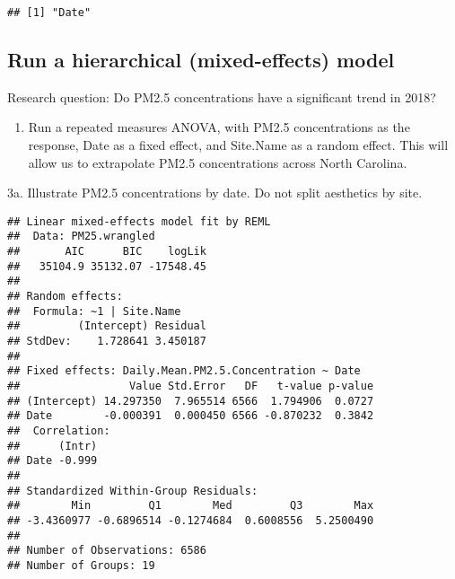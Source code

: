 \documentclass[]{article}
\newenvironment{Shaded}{\begin{snugshade}}{\end{snugshade}}
\newcommand{\KeywordTok}[1]{\textcolor[rgb]{0.13,0.29,0.53}{\textbf{#1}}}
\newcommand{\DataTypeTok}[1]{\textcolor[rgb]{0.13,0.29,0.53}{#1}}
\newcommand{\DecValTok}[1]{\textcolor[rgb]{0.00,0.00,0.81}{#1}}
\newcommand{\FloatTok}[1]{\textcolor[rgb]{0.00,0.00,0.81}{#1}}
\newcommand{\StringTok}[1]{\textcolor[rgb]{0.31,0.60,0.02}{#1}}
\newcommand{\OperatorTok}[1]{\textcolor[rgb]{0.81,0.36,0.00}{\textbf{#1}}}
\newcommand{\NormalTok}[1]{#1}
\providecommand{\tightlist}{%
  \setlength{\itemsep}{0pt}\setlength{\parskip}{0pt}}
\begin{document}
\begin{verbatim}
## [1] "Date"
\end{verbatim}

\subsection{Run a hierarchical (mixed-effects)
model}\label{run-a-hierarchical-mixed-effects-model}

Research question: Do PM2.5 concentrations have a significant trend in
2018?

\begin{enumerate}
\def\labelenumi{\arabic{enumi}.}
\setcounter{enumi}{2}
\tightlist
\item
  Run a repeated measures ANOVA, with PM2.5 concentrations as the
  response, Date as a fixed effect, and Site.Name as a random effect.
  This will allow us to extrapolate PM2.5 concentrations across North
  Carolina.
\end{enumerate}

3a. Illustrate PM2.5 concentrations by date. Do not split aesthetics by
site.

\begin{Shaded}
\end{Shaded}

\begin{verbatim}
## Linear mixed-effects model fit by REML
##  Data: PM25.wrangled 
##       AIC      BIC    logLik
##   35104.9 35132.07 -17548.45
## 
## Random effects:
##  Formula: ~1 | Site.Name
##         (Intercept) Residual
## StdDev:    1.728641 3.450187
## 
## Fixed effects: Daily.Mean.PM2.5.Concentration ~ Date 
##                 Value Std.Error   DF   t-value p-value
## (Intercept) 14.297350  7.965514 6566  1.794906  0.0727
## Date        -0.000391  0.000450 6566 -0.870232  0.3842
##  Correlation: 
##      (Intr)
## Date -0.999
## 
## Standardized Within-Group Residuals:
##        Min         Q1        Med         Q3        Max 
## -3.4360977 -0.6896514 -0.1274684  0.6008556  5.2500490 
## 
## Number of Observations: 6586
## Number of Groups: 19
\end{verbatim}
\end{document}
